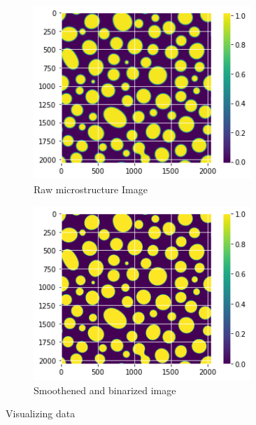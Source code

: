 \documentclass[12pt, a4paper]{report}
\begin{document}
\begin{figure}[H]
\centering
\begin{subfigure}{0.45\textwidth}
  \centering
  \includegraphics[width=0.9\textwidth]{Pictures/DataProcessingNonSmoothened.png}
  \caption{Raw microstructure Image}
  \label{img:microstrImg}
\end{subfigure}
\begin{subfigure}{.45\textwidth}
  \centering
  \includegraphics[width=0.9\textwidth]{Pictures/DataProcessingSmoothened.png}
  \caption{Smoothened and binarized image}
  \label{img:MicrostrImg}
\end{subfigure}
\caption{Visualizing data}
\label{fig:test}
\end{figure}

\end{document}
